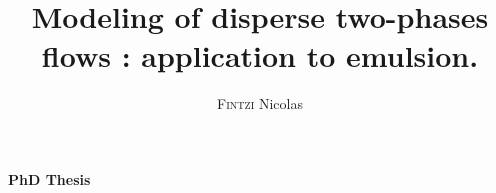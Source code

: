 \makeatletter
\begin{titlepage}

\begin{table}[h!]
\begin{minipage}[h]{0.5\linewidth}
\end{minipage}
\hspace{1cm}
\begin{minipage}[h]{0.5\linewidth}
\end{minipage}
\end{table}

\vfill

\begin{center}
{\Large\textbf{PhD Thesis}}\\

\vspace{3em}
\vspace{10pt}
\title{Modeling of disperse two-phases flows : application to emulsion.}
{\huge\textbf{\@title}} \\
\vspace{10pt}


\vspace{2em}
\author{\textsc{Fintzi} Nicolas}
{\LARGE \@author}

\vspace{3em}
{\large\textbf{\@date}}\\
\end{center}


\vfill


\vspace{1em}

\vspace{1em}


\end{titlepage}
